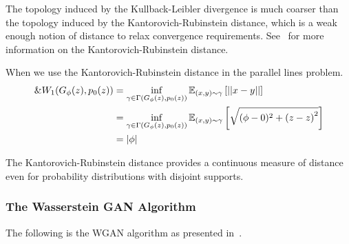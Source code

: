 The topology induced by the Kullback-Leibler divergence is much
coarser than the topology induced by the Kantorovich-Rubinstein
distance, which is a weak enough notion of distance to relax
convergence requirements. See~\cite{ref:villani-2008} for more
information on the Kantorovich-Rubinstein distance.

\begin{example}
  When we use the Kantorovich-Rubinstein distance in the parallel
  lines problem.
  \begin{align}
    \&W_1(G_\phi(z), p_0(z)) & = \inf_{\gamma \in
                           \Gamma(G_\phi(z),p_0(z))}\mathbb{E}_{(x,y) \sim
                           \gamma} \left[ || x-y || \right] \\
                         & =\inf_{\gamma \in \Gamma(G_\phi(z),
                           p_0(z))}\mathbb{E}_{(x,y) \sim \gamma} \left[ \sqrt{(\phi - 0)^2 + {(z - z)}^2}
                           \right] \\
                         & =|\phi|
  \end{align}
\end{example}

The Kantorovich-Rubinstein distance provides a continuous measure of
distance even for probability distributions with disjoint supports.

\subsubsection*{The Wasserstein GAN Algorithm}

The following is the WGAN algorithm as presented in~\cite{ref:arjovsky-2017}.

